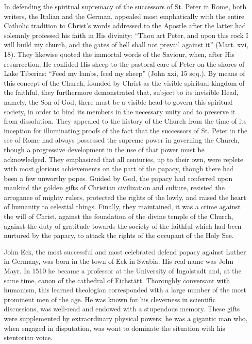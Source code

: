 In defending the spiritual supremacy of the successors of St. Peter
in Rome, both writers, the Italian and the German, appealed most
emphatically with the entire Catholic tradition to Christ’s words addressed
to the Apostle after the latter had solemnly professed his faith
in His divinity: “Thou art Peter, and upon this rock I will build my
church, and the gates of hell shall not prevail against it” (Matt. xvi,
18). They likewise quoted the immortal words of the Saviour, when,
after His resurrection, He confided His sheep to the pastoral care of
Peter on the shores of Lake Tiberias: ``Feed my lambs, feed my sheep''
(John xxi, 15 sqq.). By means of this concept of the Church, founded
by Christ as the visible spiritual kingdom of the faithful, they furthermore
demonstrated that, subject to its invisible Head, namely, the
Son of God, there must be a visible head to govern this spiritual society,
in order to bind its members in the necessary unity and to preserve
it from dissolution. They appealed to the history of the Church
from the time of its inception for illuminating proofs of the fact that
the successors of St. Peter in the see of Rome had always possessed the
supreme power in governing the Church, though a progressive
development in the use of that power must be acknowledged. They
emphasized that all centuries, up to their own, were replete with most
glorious achievements on the part of the papacy, though there had
been a few unworthy popes. Guided by God, the papacy had conferred
upon mankind the golden gifts of Christian civilization and culture,
resisted the arrogance of mighty rulers, protected the rights of the
lowly, and raised the heart of humanity to celestial things. Finally,
they maintained, it was a crime against the will of Christ, against the
foundation of the divine temple of the Church, against the duty of
gratitude towards the society of the faithful which had been
nurtured by the papacy, to attack the rights of the occupant
of the Holy
See.

John Eck, the most successful and most celebrated defend
papacy against Luther in Germany, was born in the town of Eck in
Swabia. His real name was John Mayr. In 1510 he became a professor
at the University of Ingolstadt and, at the same time, canon of the
cathedral of Eichstätt. Thoroughly conversant with humanism, this
learned theologian corresponded with a large number of the most
prominent men of the age. He was known for his cleverness in
scientific discussions, was well-read and endowed with a stupendous
memory. These gifts were supplemented by extraordinary physical
powers; he was a gigantic man who, when engaged in disputation,
was wont to dominate the situation with his stentorian voice.

